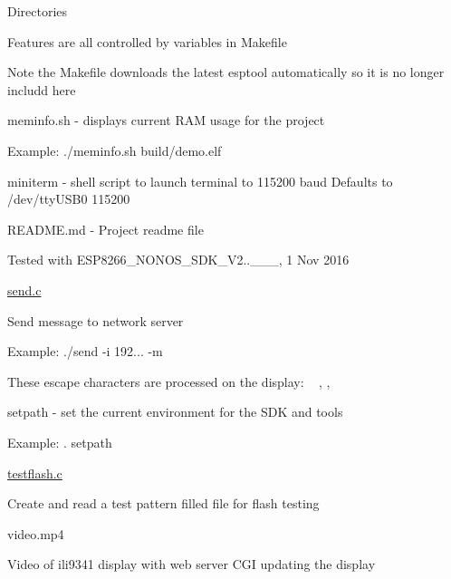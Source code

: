 \begin{DoxyParagraph}{Directories}
\begin{DoxyItemize}
\begin{DoxyItemize}
\begin{DoxyItemize}
\item Features are all controlled by variables in Makefile
\item Note the Makefile downloads the latest esptool automatically so it is no longer includd here
\end{DoxyItemize}
\item meminfo.\+sh -\/ displays current R\+AM usage for the project
\begin{DoxyItemize}
\item Example\+: ./meminfo.sh build/demo.\+elf
\end{DoxyItemize}
\item miniterm -\/ shell script to launch terminal to 115200 baud Defaults to /dev/tty\+U\+S\+B0 115200
\item R\+E\+A\+D\+M\+E.\+md -\/ Project readme file
\begin{DoxyItemize}
\item Tested with E\+S\+P8266\+\_\+\+N\+O\+N\+O\+S\+\_\+\+S\+D\+K\+\_\+\+V2..\+\_\+\_\+\_, 1 Nov 2016
\end{DoxyItemize}
\item \hyperlink{send_8c}{send.\+c}
\begin{DoxyItemize}
\item Send message to network server
\item Example\+: ./send -\/i 192... -\/m \textquotesingle{}\textquotesingle{}
\begin{DoxyItemize}
\item These escape characters are processed on the display\+: ~\newline
, , 
\end{DoxyItemize}
\end{DoxyItemize}
\item setpath -\/ set the current environment for the S\+DK and tools
\begin{DoxyItemize}
\item Example\+: . setpath
\end{DoxyItemize}
\item \hyperlink{testflash_8c}{testflash.\+c}
\begin{DoxyItemize}
\item Create and read a test pattern filled file for flash testing
\end{DoxyItemize}
\item video.\+mp4
\begin{DoxyItemize}
\item Video of ili9341 display with web server C\+GI updating the display

\end{DoxyItemize}
\end{DoxyItemize}
\end{DoxyItemize}
\end{DoxyParagraph}

